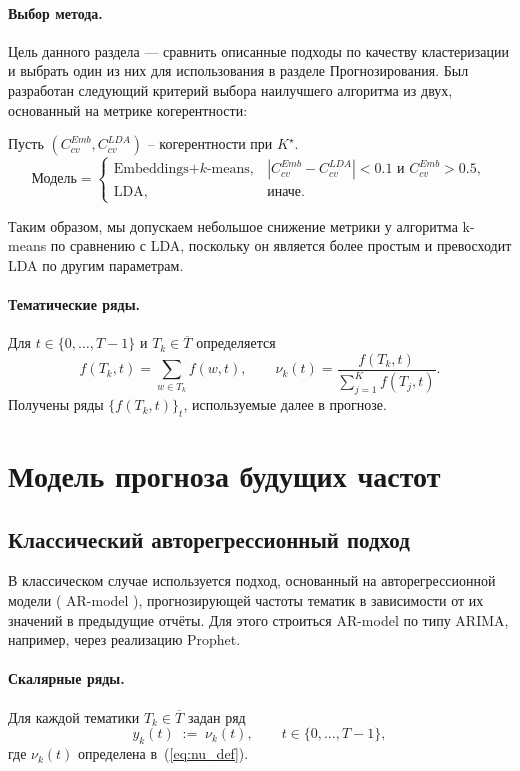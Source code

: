 \documentclass[14pt,a4paper]{article}
\begin{document}
\paragraph{Выбор метода.}
Цель данного раздела — сравнить описанные подходы по качеству кластеризации и выбрать один из них для использования в разделе Прогнозирования. Был разработан следующий критерий выбора наилучшего алгоритма из двух, основанный на метрике когерентности:

Пусть $(C_{cv}^{Emb},C_{cv}^{LDA})$ – когерентности при $K^{\star}$.  
\[
  \text{Модель}=
  \begin{cases}
    \text{Embeddings+$k$-means}, &
    |C_{cv}^{Emb} - C_{cv}^{LDA}| < 0.1 \text{ и } C_{cv}^{Emb} > 0.5,\\[4pt]
    \text{LDA}, & \text{иначе}.
  \end{cases}
\]

Таким образом, мы допускаем небольшое снижение метрики у алгоритма k-means по сравнению с LDA, поскольку он является более простым и превосходит LDA по другим параметрам.

\paragraph{Тематические ряды.}
Для $t\in\{0,\dots,T{-}1\}$ и $T_k\in\overline{T}$ определяется
\[
  f(T_k,t)=\sum_{w\in T_k}f(w,t),
\qquad
  \nu_k(t)=\frac{f(T_k,t)}{\sum_{j=1}^{K}f(T_j,t)}.
\]
Получены ряды $\{f(T_k,t)\}_{t}$, используемые далее в прогнозе.

\newpage
\section{Модель прогноза будущих частот}
\subsection{Классический авторегрессионный подход}
\label{ssec:classic}
В классическом случае используется подход, основанный на авторегрессионной модели ( AR-model ), прогнозирующей частоты тематик в зависимости от их значений в предыдущие отчёты. Для этого строиться AR-model по типу ARIMA, например, через реализацию Prophet.

\paragraph{Скалярные ряды.}
Для каждой тематики $T_k\in\overline{T}$ задан ряд
\[
  y_k(t)\;:=\;\nu_k(t), \qquad t\in\{0,\dots,T{-}1\},
\]
где $\nu_k(t)$ определена в~(\ref{eq:nu_def}).  
\end{document}

